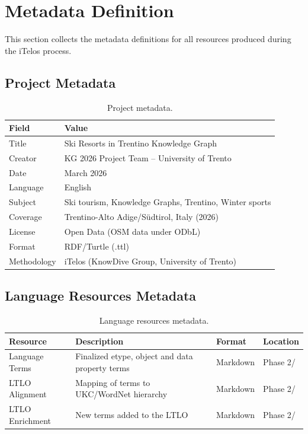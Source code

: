 \section{Metadata Definition}

This section collects the metadata definitions for all resources produced during the iTelos process.

\subsection{Project Metadata}

\begin{table}[h!]
\centering
\begin{tabular}{|l|p{9cm}|}
\hline
\textbf{Field} & \textbf{Value} \\
\hline
Title & Ski Resorts in Trentino Knowledge Graph \\
Creator & KG 2026 Project Team -- University of Trento \\
Date & March 2026 \\
Language & English \\
Subject & Ski tourism, Knowledge Graphs, Trentino, Winter sports \\
Coverage & Trentino-Alto Adige/S\"{u}dtirol, Italy (2026) \\
License & Open Data (OSM data under ODbL) \\
Format & RDF/Turtle (.ttl) \\
Methodology & iTelos (KnowDive Group, University of Trento) \\
\hline
\end{tabular}
\caption{Project metadata.}
\end{table}

\subsection{Language Resources Metadata}

\begin{table}[h!]
\centering
\small
\begin{tabular}{|l|p{5cm}|l|l|}
\hline
\textbf{Resource} & \textbf{Description} & \textbf{Format} & \textbf{Location} \\
\hline
Language Terms & Finalized etype, object and data property terms & Markdown & Phase 2/ \\
LTLO Alignment & Mapping of terms to UKC/WordNet hierarchy & Markdown & Phase 2/ \\
LTLO Enrichment & New terms added to the LTLO & Markdown & Phase 2/ \\
\hline
\end{tabular}
\caption{Language resources metadata.}
\end{table}

